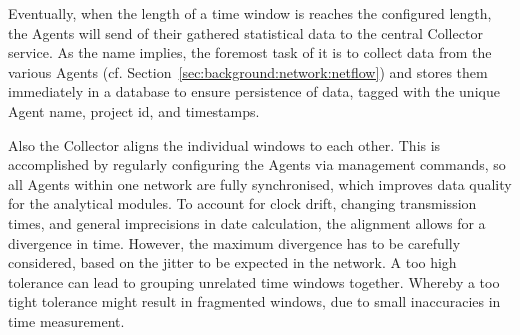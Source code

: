 Eventually, when the length of a time window is reaches the configured length, the Agents will send of their gathered statistical data to the central Collector service.
As the name implies, the foremost task of it is to collect data from the various Agents (cf. Section~\ref{sec:background:network:netflow}) and stores them immediately in a database to ensure persistence of data, tagged with the unique Agent name, project id, and timestamps.

Also the Collector aligns the individual windows to each other. This is accomplished by regularly configuring the Agents via management commands, so all Agents within one network are fully synchronised, which improves data quality for the analytical modules. To account for clock drift, changing transmission times, and general imprecisions in date calculation, the alignment allows for a divergence in time. However, the maximum divergence has to be carefully considered, based on the jitter to be expected in the network.
A too high tolerance can lead to grouping unrelated time windows together. Whereby a too tight tolerance might result in fragmented windows, due to small inaccuracies in time measurement.

